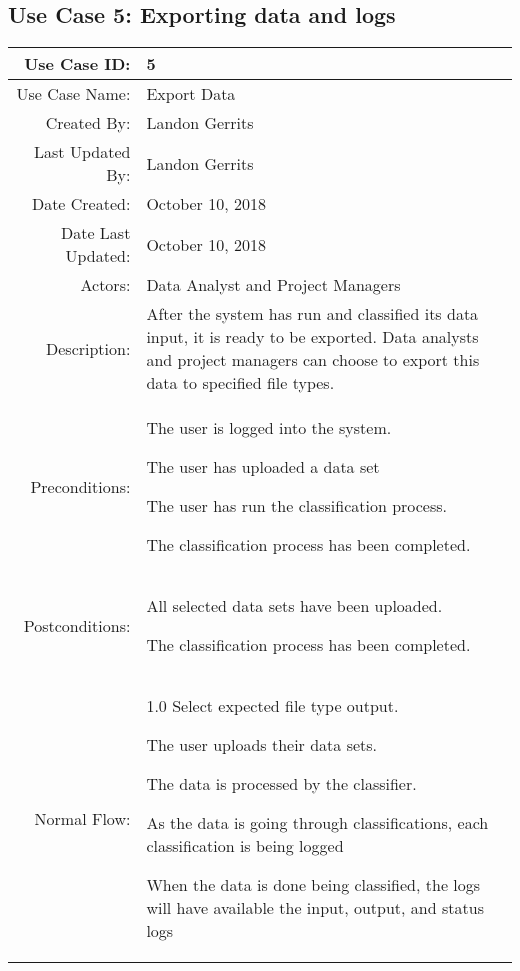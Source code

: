 \documentclass[12pt,oneside,letterpaper]{article}
\newenvironment{packed_enumerate}{ %
\vspace{-7mm}
\begin{enumerate}
  \setlength{\itemsep}{0pt}
  \setlength{\parskip}{0pt}
  \setlength{\parsep}{0pt}
}{\end{enumerate}
\vspace{-8mm}}
\begin{document}
\subsection{\label{Upload Data Sets}Use Case 5: Exporting data and logs}

\begin{longtable}{|r|p{3.8in}|}
\hline
Use Case ID:&5\\
\hline
Use Case Name:&Export Data\\
\hline
Created By:&Landon Gerrits\\
\hline
Last Updated By:&Landon Gerrits\\
\hline
Date Created:&October 10, 2018\\
\hline
Date Last Updated:&October 10, 2018\\
\hline
Actors:&Data Analyst and Project Managers\\
\hline
Description:&After the system has run and classified its data input, it is ready to be exported. Data analysts and project managers can choose to export this data to specified file types.\\
\hline
Preconditions:&\begin{packed_enumerate}
\item The user is logged into the system.
\item The user has uploaded a data set
\item The user has run the classification process.
\item The classification process has been completed.
\end{packed_enumerate}\\
\hline
Postconditions:&\begin{packed_enumerate}
\item All selected data sets have been uploaded.
\item The classification process has been completed.
\end{packed_enumerate}\\
\hline
Normal Flow:&1.0 Select expected file type output.\newline
\begin{packed_enumerate}
\item The user uploads their data sets.
\item The data is processed by the classifier.
\item As the data is going through classifications, each classification is being logged 
\item When the data is done being classified, the logs will have available the input, output, and status logs

\end{packed_enumerate}
\end{longtable}
\end{document}
